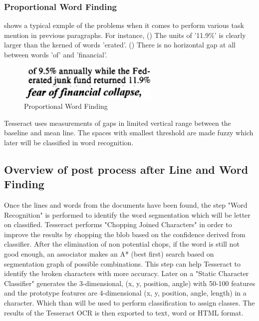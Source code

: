 \subsubsection{Proportional Word Finding}

 shows a typical exmple of the problems when it comes to perform various task mention in previous paragraphs. For instance, () The units of '11.9\%' is clearly larger than the kerned of words 'erated'. () There is no horizontal gap at all between words 'of' and 'financial'.

\begin{figure}[ht]
    \centering
    \includegraphics[width=0.6\textwidth]{chapters/images/OCR/Word_Finding.JPG}
    \caption{Proportional Word Finding\cite{AnOverviewoftheTesseractOCREngine}}
    \label{fig:Proportional_Word_Finding}
\end{figure}

Tesseract uses measurements of gaps in limited vertical range between the baseline and mean line. The spaces with smallest threshold are made fuzzy which later will be classified in word recognition.



\subsection{Overview of post process after Line and Word Finding}

Once the lines and words from the documents have been found, the step "Word Recognition" \cite{AnOverviewoftheTesseractOCREngine} is performed to identify the word segmentation which will be letter on classified. Tesseract performs "Chopping Joined Characters" in order to improve the results by chopping the blob based on the confidence derived from classifier. After the elimination of non potential chops, if the word is still not good enough, an associator makes an A* (best first) search based on  segmentation graph of possible combinations. This step can help Tesseract to identify the broken characters with more accuracy. Later on a "Static Character Classifier" \cite{AnOverviewoftheTesseractOCREngine} generates the 3-dimensional, (x, y, position, angle) with 50-100 features and the prototype features are 4-dimensional (x, y, position, angle, length) in a character. Which than will be used to perform classification to assign classes. The results of the Tesseract OCR is then exported to text, word or HTML format.

















